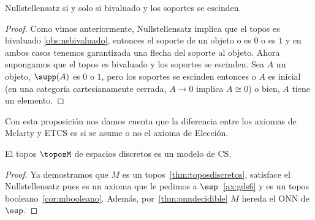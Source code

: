\begin{proposition}
    Nullstellensatz si y solo si bivaluado y los soportes se escinden.
\end{proposition}
\begin{proof}
    Como vimos anteriormente, Nullstellensatz implica que el topos es bivaluado \ref{obs:nsbivaluado}, entonces
    el soporte de un objeto o es $0$ o es $1$ y en ambos casos tenemos garantizada una flecha del soporte al objeto.
    Ahora supongamos que el topos es bivaluado y los soportes se escinden. Sea $A$ un objeto,
    $\supp(A)$ es $0$ o $1$, pero los soportes se escinden entonces o $A$ es inicial (en una 
    categoría cartesianamente cerrada, $A\to 0$ implica $A\cong 0$) o bien, $A$ tiene un elemento. 
\end{proof}

Con esta proposición nos damos cuenta que la diferencia entre los axiomas de Mclarty y ETCS es si 
se asume o no el axioma de Elección.

\begin{theorem}[label=thm:modelocs]
    El topos $\toposM$ de espacios discretos es un modelo de CS.
\end{theorem}
\begin{proof}
    Ya demostramos que $M$ es un topos~\ref{thm:toposdiscretos}, satisface el Nullstellensatz pues es un axioma que le pedimos a $\esp$~\ref{ax:gds6} y
    es un topos booleano~\ref{cor:mbooleano}. Además, por~\ref{thm:onndecidible} $M$ hereda el ONN de $\esp$.
\end{proof}
